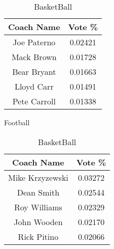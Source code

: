 \documentclass[12pt]{article}
\begin{document}
\begin{table}[!htb]
\begin{minipage}{.5\linewidth}
\centering
\begin{tabular}{ | c | c | }
\hline
Coach Name   & Vote \% \\\hline
Joe Paterno  & 0.02421 \\\hline
Mack Brown   & 0.01728 \\\hline
Bear Bryant  & 0.01663 \\\hline
Lloyd Carr   & 0.01491 \\\hline
Pete Carroll & 0.01338 \\
\hline
\end{tabular}
\caption{Football}
\end{minipage}
\begin{minipage}{.5\linewidth}
\centering
\begin{tabular}{ | c | c | }
\hline
Coach Name  & Vote \% \\\hline
Mike Krzyzewski & 0.03272 \\\hline
Dean Smith  & 0.02544 \\\hline
Roy Williams & 0.02329 \\\hline
John Wooden  & 0.02170 \\\hline
Rick Pitino  & 0.02066 \\
\hline
\end{tabular}
\caption{BasketBall}
\end{minipage}
\end{table}
\end{document}
